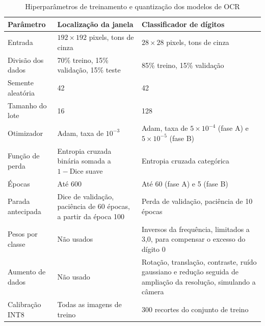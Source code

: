 \begin{table}[H]
    \centering
    \caption{Hiperparâmetros de treinamento e quantização dos modelos de OCR}
    \label{tab:hiperparametros}
    \small
    \begin{tabularx}{\textwidth}{@{}lXX@{}}
        \toprule
        \textbf{Parâmetro} & \textbf{Localização da janela} & \textbf{Classificador de dígitos} \\
        \midrule
        Entrada & $192 \times 192$ pixels, tons de cinza & $28 \times 28$ pixels, tons de cinza \\
        Divisão dos dados & 70\% treino, 15\% validação, 15\% teste & 85\% treino, 15\% validação \\
        Semente aleatória & 42 & 42 \\
        Tamanho do lote & 16 & 128 \\
        Otimizador & Adam, taxa de $10^{-3}$ & Adam, taxa de $5 \times 10^{-4}$ (fase A) e
            $5 \times 10^{-5}$ (fase B) \\
        Função de perda & Entropia cruzada binária somada a $1 - \text{Dice}$ suave &
            Entropia cruzada categórica \\
        Épocas & Até 600 & Até 60 (fase A) e 5 (fase B) \\
        Parada antecipada & Dice de validação, paciência de 60 épocas, a partir da época 100 &
            Perda de validação, paciência de 10 épocas \\
        Pesos por classe & Não usados & Inversos da frequência, limitados a 3,0, para
            compensar o excesso do dígito 0 \\
        Aumento de dados & Não usado & Rotação, translação, contraste, ruído gaussiano e
            redução seguida de ampliação da resolução, simulando a câmera \\
        Calibração INT8 & Todas as imagens de treino & 300 recortes do conjunto de treino \\
        \bottomrule
    \end{tabularx}
\end{table}

